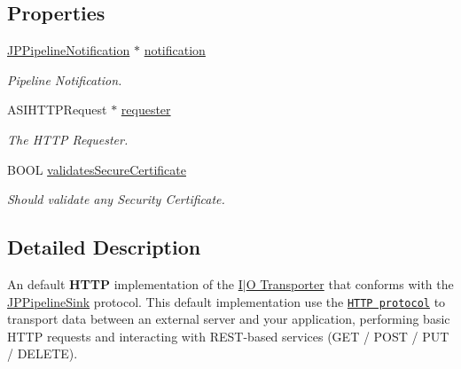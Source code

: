 \subsection*{Properties}
\begin{DoxyCompactItemize}
\item 
\hypertarget{a00014_a290cddab6355f93ad3d3925497459fc0}{
\hyperlink{a00032}{JPPipelineNotification} $\ast$ \hyperlink{a00014_a290cddab6355f93ad3d3925497459fc0}{notification}}
\label{a00014_a290cddab6355f93ad3d3925497459fc0}

\begin{DoxyCompactList}\small\item\em Pipeline Notification. \item\end{DoxyCompactList}\item 
\hypertarget{a00014_aec61cceb936f46d429b52d312f0caa09}{
ASIHTTPRequest $\ast$ \hyperlink{a00014_aec61cceb936f46d429b52d312f0caa09}{requester}}
\label{a00014_aec61cceb936f46d429b52d312f0caa09}

\begin{DoxyCompactList}\small\item\em The HTTP Requester. \item\end{DoxyCompactList}\item 
\hypertarget{a00014_a9b5dd41765aa7e924f9906189a8d56fc}{
BOOL \hyperlink{a00014_a9b5dd41765aa7e924f9906189a8d56fc}{validatesSecureCertificate}}
\label{a00014_a9b5dd41765aa7e924f9906189a8d56fc}

\begin{DoxyCompactList}\small\item\em Should validate any Security Certificate. \item\end{DoxyCompactList}\end{DoxyCompactItemize}


\subsection{Detailed Description}
An default {\bfseries HTTP} implementation of the \hyperlink{a00002}{I$|$O Transporter} that conforms with the \hyperlink{a00034}{JPPipelineSink} protocol. This default implementation use the \href{http://es.wikipedia.org/wiki/Hypertext_Transfer_Protocol}{\tt HTTP protocol} to transport data between an external server and your application, performing basic HTTP requests and interacting with REST-\/based services (GET / POST / PUT / DELETE). 

